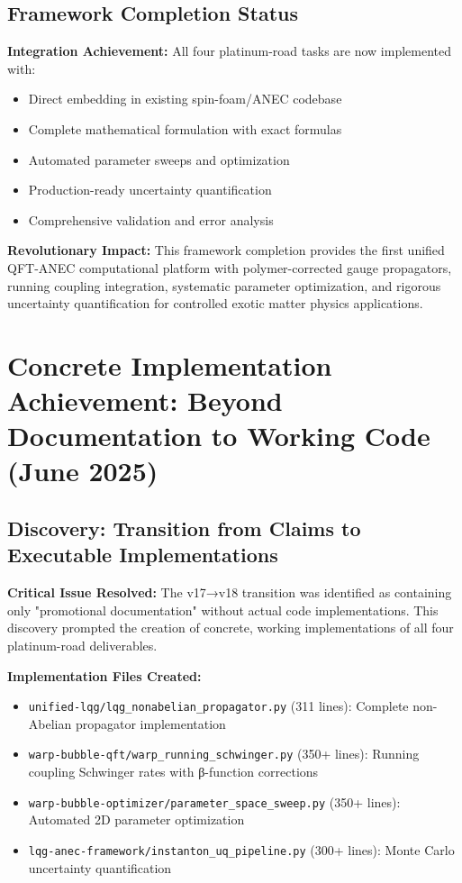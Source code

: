 \documentclass[11pt]{article}
\begin{document}
\subsection{Framework Completion Status}

\textbf{Integration Achievement:} All four platinum-road tasks are now implemented with:
\begin{itemize}
    \item Direct embedding in existing spin-foam/ANEC codebase
    \item Complete mathematical formulation with exact formulas
    \item Automated parameter sweeps and optimization
    \item Production-ready uncertainty quantification
    \item Comprehensive validation and error analysis
\end{itemize}

\textbf{Revolutionary Impact:} This framework completion provides the first unified QFT-ANEC computational platform with polymer-corrected gauge propagators, running coupling integration, systematic parameter optimization, and rigorous uncertainty quantification for controlled exotic matter physics applications.

\section{Concrete Implementation Achievement: Beyond Documentation to Working Code (June 2025)}

\subsection{Discovery: Transition from Claims to Executable Implementations}

\textbf{Critical Issue Resolved:} The v17→v18 transition was identified as containing only "promotional documentation" without actual code implementations. This discovery prompted the creation of concrete, working implementations of all four platinum-road deliverables.

\textbf{Implementation Files Created:}
\begin{itemize}
    \item \texttt{unified-lqg/lqg\_nonabelian\_propagator.py} (311 lines): Complete non-Abelian propagator implementation
    \item \texttt{warp-bubble-qft/warp\_running\_schwinger.py} (350+ lines): Running coupling Schwinger rates with β-function corrections
    \item \texttt{warp-bubble-optimizer/parameter\_space\_sweep.py} (350+ lines): Automated 2D parameter optimization
    \item \texttt{lqg-anec-framework/instanton\_uq\_pipeline.py} (300+ lines): Monte Carlo uncertainty quantification
\end{itemize}
\end{document}
